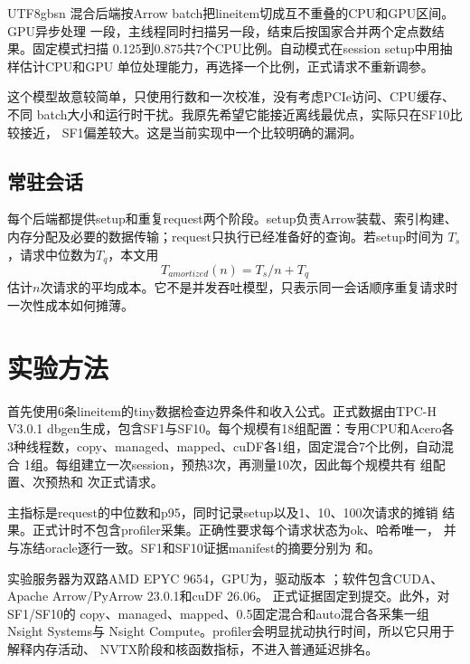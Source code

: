 \documentclass[10.5pt,compsoc]{CjC}
\begin{document}
\begin{CJK*}{UTF8}{gbsn}
混合后端按Arrow batch把lineitem切成互不重叠的CPU和GPU区间。GPU异步处理
一段，主线程同时扫描另一段，结束后按国家合并两个定点数结果。固定模式扫描
0.125到0.875共7个CPU比例。自动模式在session setup中用抽样估计CPU和GPU
单位处理能力，再选择一个比例，正式请求不重新调参。

这个模型故意较简单，只使用行数和一次校准，没有考虑PCIe访问、CPU缓存、不同
batch大小和运行时干扰。我原先希望它能接近离线最优点，实际只在SF10比较接近，
SF1偏差较大。这是当前实现中一个比较明确的漏洞。

\subsection{常驻会话}

每个后端都提供setup和重复request两个阶段。setup负责Arrow装载、索引构建、
内存分配及必要的数据传输；request只执行已经准备好的查询。若setup时间为
$T_s$，请求中位数为$T_q$，本文用
\begin{equation}
  T_{amortized}(n)=T_s/n+T_q
\end{equation}
估计$n$次请求的平均成本。它不是并发吞吐模型，只表示同一会话顺序重复请求时
一次性成本如何摊薄。

\section{实验方法}

首先使用6条lineitem的tiny数据检查边界条件和收入公式。正式数据由TPC-H
V3.0.1 dbgen生成，包含SF1与SF10。每个规模有18组配置：专用CPU和Acero各
3种线程数，copy、managed、mapped、cuDF各1组，固定混合7个比例，自动混合
1组。每组建立一次session，预热3次，再测量10次，因此每个规模共有
\VSevenSfOneConfigurations 组配置、\VSevenSfOneWarmupRuns 次预热和
\VSevenSfOneMeasuredRuns 次正式请求。

主指标是request的中位数和p95，同时记录setup以及1、10、100次请求的摊销
结果。正式计时不包含profiler采集。正确性要求每个请求状态为ok、哈希唯一，
并与冻结oracle逐行一致。SF1和SF10证据manifest的摘要分别为
\texttt{\VSevenSfOneManifestShort}和\texttt{\VSevenSfTenManifestShort}。

实验服务器为双路AMD EPYC 9654，GPU为\VSevenGpuName，驱动版本
\VSevenGpuDriver；软件包含CUDA、Apache Arrow/PyArrow 23.0.1和cuDF 26.06。
正式证据固定到提交\texttt{\VSevenGitCommitShort}。此外，对SF1/SF10的
copy、managed、mapped、0.5固定混合和auto混合各采集一组Nsight Systems与
Nsight Compute。profiler会明显扰动执行时间，所以它只用于解释内存活动、
NVTX阶段和核函数指标，不进入普通延迟排名。


\end{CJK*}
\end{document}
